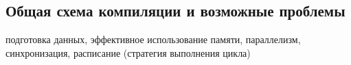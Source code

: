 \subsection{Общая схема компиляции и возможные проблемы}
\label{impl:problem}





подготовка данных, эффективное использование памяти, параллелизм, синхронизация,
расписание (стратегия выполнения цикла)
